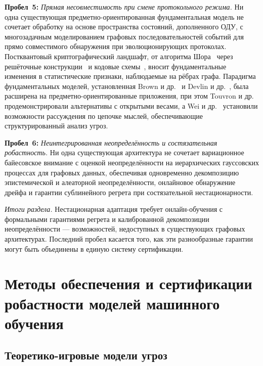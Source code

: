 \medskip
\noindent\textbf{Пробел~5:} \emph{Прямая несовместимость при смене протокольного режима.} Ни одна существующая предметно-ориентированная фундаментальная модель не сочетает обработку на основе пространства состояний, дополненного ОДУ, с многозадачным моделированием графовых последовательностей событий для прямо совместимого обнаружения при эволюционирующих протоколах. Постквантовый криптографический ландшафт, от алгоритма Шора~\cite{Shor1997} через решёточные конструкции~\cite{Ducas2018,Proos2003} и кодовые схемы~\cite{McEliece1978}, вносит фундаментальные изменения в статистические признаки, наблюдаемые на рёбрах графа. Парадигма фундаментальных моделей, установленная Brown и др.~\cite{Brown2020} и Devlin и др.~\cite{Devlin2019}, была расширена на предметно-ориентированные приложения, при этом Touvron и др.~\cite{Touvron2023} продемонстрировали альтернативы с открытыми весами, а Wei и др.~\cite{Wei2022cot} установили возможности рассуждения по цепочке мыслей, обеспечивающие структурированный анализ угроз.

\medskip
\noindent\textbf{Пробел~6:} \emph{Неинтегрированная неопределённость и состязательная робастность.} Ни одна существующая архитектура не сочетает вариационное байесовское внимание с оценкой неопределённости на иерархических гауссовских процессах для графовых данных, обеспечивая одновременно декомпозицию эпистемической и алеаторной неопределённости, онлайновое обнаружение дрейфа и гарантии сублинейного регрета при состязательной нестационарности.

\medskip
\noindent\textit{Итоги раздела.} Нестационарная адаптация требует онлайн-обучения с формальными гарантиями регрета и калиброванной декомпозиции неопределённости --- возможностей, недоступных в существующих графовых архитектурах. Последний пробел касается того, как эти разнообразные гарантии могут быть объединены в единую систему сертификации.


\section{Методы обеспечения и сертификации робастности моделей машинного обучения}
\label{sec:certification}

\subsection{Теоретико-игровые модели угроз}

